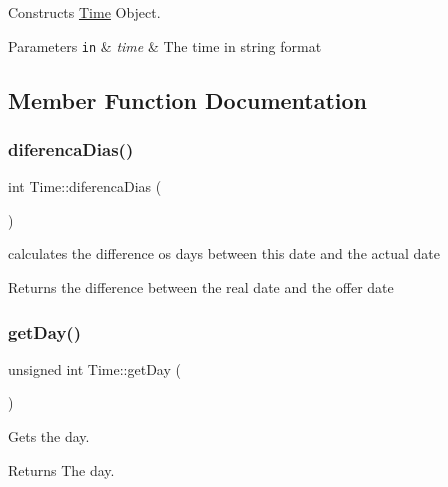 Constructs \hyperlink{classTime}{Time} Object. 


\begin{DoxyParams}[1]{Parameters}
\mbox{\tt in}  & {\em time} & The time in string format \\
\hline
\end{DoxyParams}


\subsection{Member Function Documentation}
\mbox{\label{classTime_a346c1dbc706dfd41e4a15b16577e4265}} 
\subsubsection{\texorpdfstring{diferenca\+Dias()}{diferencaDias()}}
{\footnotesize\ttfamily int Time\+::diferenca\+Dias (\begin{DoxyParamCaption}{ }\end{DoxyParamCaption})}



calculates the difference os days between this date and the actual date 

\begin{DoxyReturn}{Returns}
the difference between the real date and the offer date 
\end{DoxyReturn}
\mbox{\label{classTime_abdccc37217b520155a67a1d732014f1a}} 
\subsubsection{\texorpdfstring{get\+Day()}{getDay()}}
{\footnotesize\ttfamily unsigned int Time\+::get\+Day (\begin{DoxyParamCaption}{ }\end{DoxyParamCaption})}



Gets the day. 

\begin{DoxyReturn}{Returns}
The day. 
\end{DoxyReturn}
\mbox{\label{classTime_ac38ba7bbc9876d7d75c6fb16ba7ac453}} 
